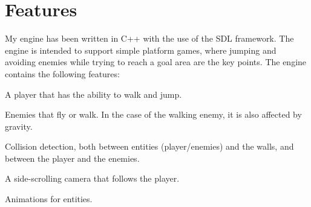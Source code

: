 \section{Features}
\label{02}

My engine has been written in C++ with the use of the SDL framework. The engine is intended to support simple platform games, where jumping and avoiding enemies while trying to reach a goal area are the key points. The engine contains the following features:

\begin{my_itemize}

	\item A player that has the ability to walk and jump.

	\item Enemies that fly or walk. In the case of the walking enemy, it is also affected by gravity.

	\item Collision detection, both between entities (player/enemies) and the walls, and between the player and the enemies.

	\item A side-scrolling camera that follows the player.

	\item Animations for entities.

\end{my_itemize}